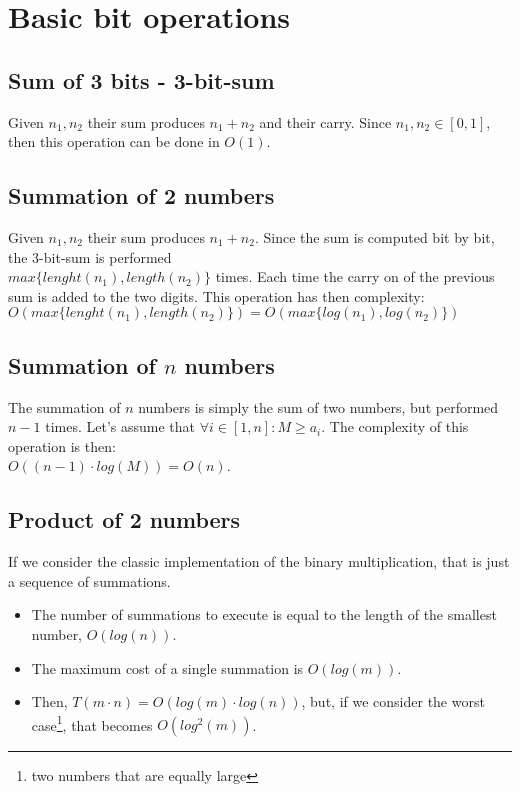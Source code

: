 \documentclass[12pt, a4paper, english]{report}
\begin{document}
\section{Basic bit operations}
\subsection{Sum of 3 bits - 3-bit-sum}
Given $n_{1}, n_{2}$ their sum produces $n_{1} + n_{2}$ and their carry. \newline
Since $n_{1}, n_{2} \in [0,1]$, then this operation can be done in $O(1)$.

\subsection{Summation of 2 numbers}
Given $n_{1}, n_{2}$ their sum produces $n_{1} + n_{2}$. \newline
Since the sum is computed bit by bit, the 3-bit-sum is performed\\$max\{lenght(n_{1}), length(n_{2})\}$ times.\newline
Each time the carry on of the previous sum is added to the two digits. \newline
This operation has then complexity:\\$O(max\{lenght(n_{1}), length(n_{2})\}) = O(max\{log(n_{1}), log(n_{2})\})$

\subsection{Summation of $n$ numbers}
The summation of $n$ numbers is simply the sum of two numbers, but performed $n - 1$ times. \newline
Let's assume that $\forall i \in [1,n]: M \geq a_{i}$. \newline
The complexity of this operation is then:\\$O((n-1) \cdot log(M)) = O(n)$. \newline

\subsection{Product of 2 numbers}
If we consider the classic implementation of the binary multiplication, that is just a sequence of summations. \newline
\begin{itemize}
    \item The number of summations to execute is equal to the length of the smallest number, $O(log(n))$.
    \item The maximum cost of a single summation is $O(log(m))$.
    \item Then, $T(m \cdot n) = O(log(m) \cdot log(n))$, but, if we consider the worst case\footnote{two numbers that are equally large}, that becomes $O(log^{2}(m))$.
\end{itemize}
\end{document}
